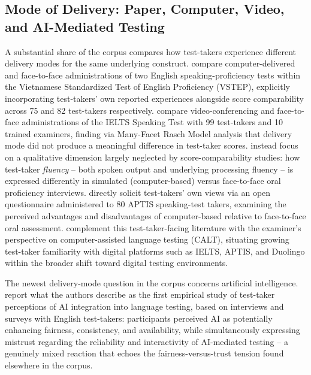 \documentclass[11pt]{article}
\begin{document}
\subsection{Mode of Delivery: Paper, Computer, Video, and AI-Mediated Testing}

A substantial share of the corpus compares how test-takers experience different delivery modes for the same underlying construct. \citet{dang2024vstep} compare computer-delivered and face-to-face administrations of two English speaking-proficiency tests within the Vietnamese Standardized Test of English Proficiency (VSTEP), explicitly incorporating test-takers' own reported experiences alongside score comparability across 75 and 82 test-takers respectively. \citet{nakatsuhara2021videoconferencing} compare video-conferencing and face-to-face administrations of the IELTS Speaking Test with 99 test-takers and 10 trained examiners, finding via Many-Facet Rasch Model analysis that delivery mode did not produce a meaningful difference in test-taker scores. \citet{quaid2021fluency} instead focus on a qualitative dimension largely neglected by score-comparability studies: how test-taker \emph{fluency} -- both spoken output and underlying processing fluency -- is expressed differently in simulated (computer-based) versus face-to-face oral proficiency interviews. \citet{amengual2017views} directly solicit test-takers' own views via an open questionnaire administered to 80 APTIS speaking-test takers, examining the perceived advantages and disadvantages of computer-based relative to face-to-face oral assessment. \citet{nguyen2026examiners} complement this test-taker-facing literature with the examiner's perspective on computer-assisted language testing (CALT), situating growing test-taker familiarity with digital platforms such as IELTS, APTIS, and Duolingo within the broader shift toward digital testing environments.

The newest delivery-mode question in the corpus concerns artificial intelligence. \citet{zhang2023testtakers} report what the authors describe as the first empirical study of test-taker perceptions of AI integration into language testing, based on interviews and surveys with English test-takers: participants perceived AI as potentially enhancing fairness, consistency, and availability, while simultaneously expressing mistrust regarding the reliability and interactivity of AI-mediated testing -- a genuinely mixed reaction that echoes the fairness-versus-trust tension found elsewhere in the corpus.
\end{document}
